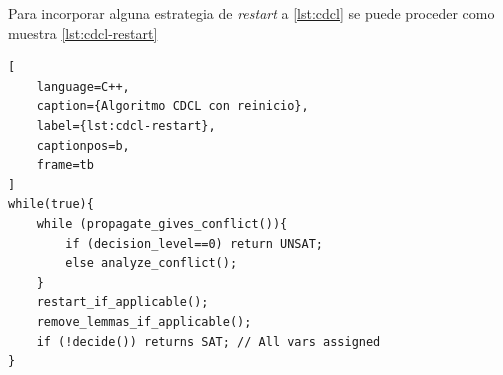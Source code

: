 Para incorporar alguna estrategia de \textit{restart} a \ref{lst:cdcl}  se puede proceder como muestra \ref{lst:cdcl-restart} \cite{oliveras2009dpll_cdcl}

\begin{lstlisting}[
    language=C++,
    caption={Algoritmo CDCL con reinicio},
    label={lst:cdcl-restart},
    captionpos=b,
    frame=tb
]
while(true){
	while (propagate_gives_conflict()){
		if (decision_level==0) return UNSAT;
		else analyze_conflict();
	}
	restart_if_applicable();
	remove_lemmas_if_applicable();
	if (!decide()) returns SAT; // All vars assigned
}

\end{lstlisting}






